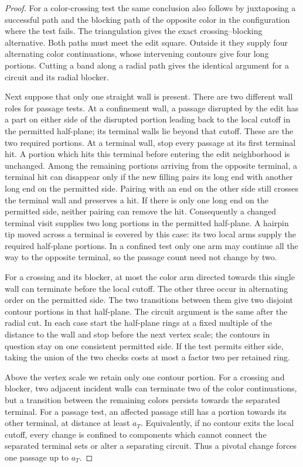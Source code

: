 \begin{proof}
For a color-crossing test the same conclusion also follows by
juxtaposing a successful path and the blocking path of the
opposite color in the configuration where the test fails.  The
triangulation gives the exact crossing--blocking alternative.
Both paths must meet the edit square.  Outside it they supply
four alternating color continuations, whose intervening contours
give four long portions.  Cutting a band along a radial path
gives the identical argument for a circuit and its radial
blocker.

Next suppose that only one straight wall is present.  There are
two different wall roles for passage tests.  At a confinement
wall, a passage disrupted by the edit has a part on either side
of the disrupted portion leading back to the local cutoff in
the permitted half-plane; its terminal walls lie beyond that
cutoff.  These are the two required portions.  At a terminal
wall, stop every passage at its first terminal hit.  A portion
which hits this terminal before entering the edit neighborhood
is unchanged.  Among the remaining portions arriving from the
opposite terminal, a terminal hit can disappear only if the new
filling pairs its long end with another long end on the permitted
side.  Pairing with an end on the other side still crosses the
terminal wall and preserves a hit.  If there is only one long end
on the permitted side, neither pairing can remove the hit.
Consequently a changed terminal visit supplies two long portions
in the permitted half-plane.  A
hairpin tip moved across a terminal is covered by this case:
its two local arms supply the required half-plane portions.
In a confined test only one arm may continue all the way to the
opposite terminal, so the passage count need not change by two.

For a crossing and its blocker, at most the color arm directed
towards this single wall can terminate before the local cutoff.
The other three occur in alternating order on the permitted
side.  The two transitions between them give two disjoint
contour portions in that half-plane.  The circuit argument is
the same after the radial cut.  In each case start the
half-plane rings at a fixed multiple of the distance to the
wall and stop before the next vertex scale; the contours in
question stay on one consistent permitted side.  If the test
permits either side, taking the union of the two checks costs
at most a factor two per retained ring.

Above the vertex scale we retain only one contour portion.
For a crossing and blocker, two adjacent incident walls can
terminate two of the color continuations, but a transition
between the remaining colors persists towards the separated
terminal.  For a passage test, an affected passage still has
a portion towards its other terminal, at distance at least
$a_T$.  Equivalently, if no contour exits the local cutoff,
every change is confined to components which cannot connect
the separated terminal sets or alter a separating circuit.
Thus a pivotal change forces one passage up to $a_T$.


\end{proof}
